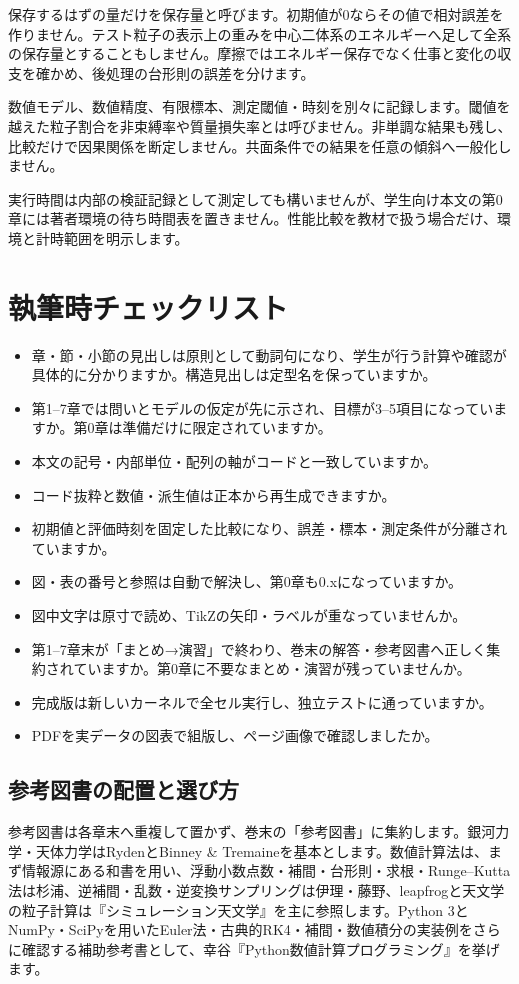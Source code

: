 \documentclass[10pt,openany]{book}
\begin{document}
保存するはずの量だけを保存量と呼びます。初期値が0ならその値で相対誤差を作りません。テスト粒子の表示上の重みを中心二体系のエネルギーへ足して全系の保存量とすることもしません。摩擦ではエネルギー保存でなく仕事と変化の収支を確かめ、後処理の台形則の誤差を分けます。

数値モデル、数値精度、有限標本、測定閾値・時刻を別々に記録します。閾値を越えた粒子割合を非束縛率や質量損失率とは呼びません。非単調な結果も残し、比較だけで因果関係を断定しません。共面条件での結果を任意の傾斜へ一般化しません。

実行時間は内部の検証記録として測定しても構いませんが、学生向け本文の第0章には著者環境の待ち時間表を置きません。性能比較を教材で扱う場合だけ、環境と計時範囲を明示します。

\section{執筆時チェックリスト}
\begin{itemize}
\item 章・節・小節の見出しは原則として動詞句になり、学生が行う計算や確認が具体的に分かりますか。構造見出しは定型名を保っていますか。
\item 第1--7章では問いとモデルの仮定が先に示され、目標が3--5項目になっていますか。第0章は準備だけに限定されていますか。
\item 本文の記号・内部単位・配列の軸がコードと一致していますか。
\item コード抜粋と数値・派生値は正本から再生成できますか。
\item 初期値と評価時刻を固定した比較になり、誤差・標本・測定条件が分離されていますか。
\item 図・表の番号と参照は自動で解決し、第0章も0.xになっていますか。
\item 図中文字は原寸で読め、TikZの矢印・ラベルが重なっていませんか。
\item 第1--7章末が「まとめ→演習」で終わり、巻末の解答・参考図書へ正しく集約されていますか。第0章に不要なまとめ・演習が残っていませんか。
\item 完成版は新しいカーネルで全セル実行し、独立テストに通っていますか。
\item PDFを実データの図表で組版し、ページ画像で確認しましたか。
\end{itemize}


\subsection{参考図書の配置と選び方}
参考図書は各章末へ重複して置かず、巻末の「参考図書」に集約します。銀河力学・天体力学はRydenとBinney \& Tremaineを基本とします。数値計算法は、まず情報源にある和書を用い、浮動小数点数・補間・台形則・求根・Runge--Kutta法は杉浦、逆補間・乱数・逆変換サンプリングは伊理・藤野、leapfrogと天文学の粒子計算は『シミュレーション天文学』を主に参照します。Python 3とNumPy・SciPyを用いたEuler法・古典的RK4・補間・数値積分の実装例をさらに確認する補助参考書として、幸谷『Python数値計算プログラミング』を挙げます。
\end{document}
